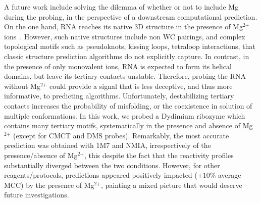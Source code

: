 \documentclass[a4,center,fleqn]{NAR}
\begin{document}
A future work include solving the dilemma of whether or not to include Mg during the probing, in the perspective of a downstream computational prediction. On the one hand, RNA reaches its native 3D structure in the presence of Mg$^{\text{2+}}$ ions~\cite{Knapp1989}. However, such native structures include non WC pairings, and complex topological motifs such as pseudoknots, kissing loops, tetraloop interactions, that classic structure prediction algorithms do not explicitly capture. In contrast, in the presence of only monovalent ions, RNA is expected to form its helical domains, but leave its  tertiary contacts unstable. Therefore, probing the RNA without Mg$^{\text{2+}}$ could provide a signal that is less deceptive, and thus more informative, to predicting algorithms. Unfortunately, destabilizing tertiary contacts increases the probability of misfolding, or the coexistence in solution of multiple conformations. In this work, we probed a Dydimium ribozyme which contains many tertiary motifs, systematically in the presence and absence of Mg$^{\text{2+}}$ (except for CMCT and DMS probes). Remarkably, the most accurate prediction was obtained with 1M7 and NMIA, irrespectively of the presence/absence of Mg$^{\text{2+}}$, this despite the fact that the reactivity profiles substantially diverged between the two conditions. However, for other reagents/protocols, predictions appeared positively impacted (+$10\%$ average MCC) by the presence of Mg$^{\text{2+}}$, painting a mixed picture that would deserve future investigations.
\end{document}
